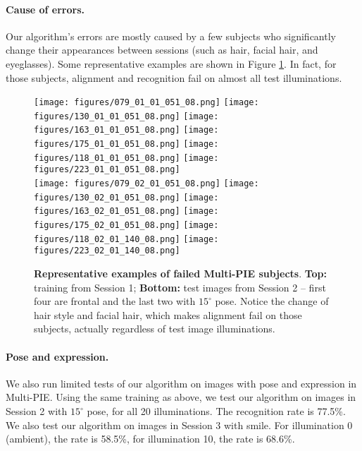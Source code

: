\documentclass[10pt,twocolumn,letterpaper]{article}
\begin{document}
\paragraph{Cause of errors.} Our algorithm's errors are mostly caused by a few subjects who significantly change their appearances between sessions (such as hair, facial hair, and eyeglasses). Some representative examples are shown in Figure \ref{fig:failed-examples}. In fact, for those subjects, alignment and recognition fail on almost all test illuminations.\vspace{-3mm} %
\begin{figure}[t]
\centering
\texttt{[image: figures/079\_01\_01\_051\_08.png]} 
\texttt{[image: figures/130\_01\_01\_051\_08.png]} 
\texttt{[image: figures/163\_01\_01\_051\_08.png]} 
\texttt{[image: figures/175\_01\_01\_051\_08.png]} 
\texttt{[image: figures/118\_01\_01\_051\_08.png]} 
\texttt{[image: figures/223\_01\_01\_051\_08.png]} \\
\texttt{[image: figures/079\_02\_01\_051\_08.png]} 
\texttt{[image: figures/130\_02\_01\_051\_08.png]} 
\texttt{[image: figures/163\_02\_01\_051\_08.png]} 
\texttt{[image: figures/175\_02\_01\_051\_08.png]} 
\texttt{[image: figures/118\_02\_01\_140\_08.png]} 
\texttt{[image: figures/223\_02\_01\_140\_08.png]} 
\caption{{\bf Representative examples of failed Multi-PIE subjects}. {\bf Top:} training from Session 1; {\bf Bottom:} test images from Session 2 -- first four are frontal and the last two with $15^\circ$ pose. Notice the change of hair style and facial hair, which makes alignment fail on those subjects, actually regardless of test image illuminations.\vspace{-3mm}}\label{fig:failed-examples}
\end{figure}

\paragraph{Pose and expression.} We also run limited tests of our algorithm on images with pose and expression in Multi-PIE.  Using the same training as above, we test our algorithm on images in Session 2 with $15^\circ$ pose, for all 20 illuminations. The recognition rate is 77.5\%. We also test our algorithm on images in Session 3 with smile. For illumination 0 (ambient), the rate is 58.5\%, for illumination 10, the rate is 68.6\%.\vspace{-2mm}
\end{document}
